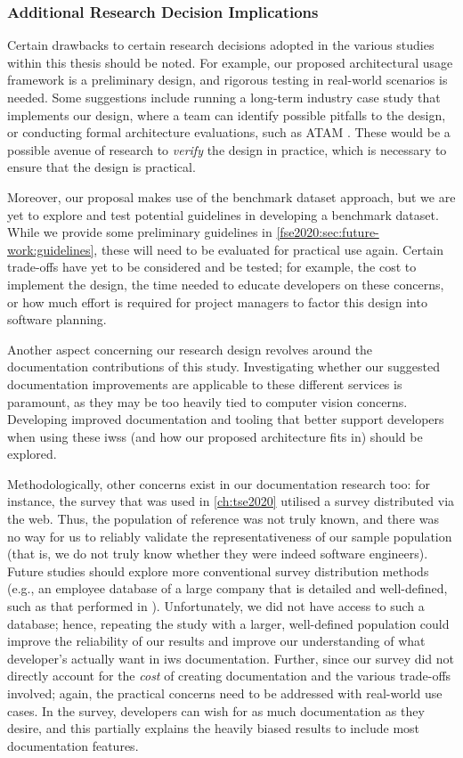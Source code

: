 \subsubsection{Additional Research Decision Implications}

Certain drawbacks to certain research decisions adopted in the various studies within this thesis should be noted. For example, our proposed architectural usage framework is a preliminary design, and rigorous testing in real-world scenarios is needed. Some suggestions include running a long-term industry case study that implements our design, where a team can identify possible pitfalls to the design, or conducting formal architecture evaluations, such as ATAM \citep{Kazman2000}. These would be a possible avenue of research to \textit{verify} the design in practice, which is necessary to ensure that the design is practical. 

Moreover, our proposal makes use of the benchmark dataset approach, but we are yet to explore and test potential guidelines in developing a benchmark dataset. While we provide some preliminary guidelines in \cref{fse2020:sec:future-work:guidelines}, these will need to be evaluated for practical use again. Certain trade-offs have yet to be considered and be tested; for example, the cost to implement the design, the time needed to educate developers on these concerns, or how much effort is required for project managers to factor this design into software planning.

Another aspect concerning our research design revolves around the documentation contributions of this study. Investigating whether our suggested documentation improvements are applicable to these different services is paramount, as they may be too heavily tied to computer vision concerns. Developing improved documentation and tooling that better support developers when using these \glspl{iws} (and how our proposed architecture fits in) should be explored. 

Methodologically, other concerns exist in our documentation research too: for instance, the survey that was used in \cref{ch:tse2020} utilised a survey distributed via the web. Thus, the population of reference was not truly known, and there was no way for us to reliably validate the representativeness of our sample population (that is, we do not truly know whether they were indeed software engineers). Future studies should explore more conventional survey distribution methods (e.g., an employee database of a large company that is detailed and well-defined, such as that performed in \citep{Robillard:hk}). Unfortunately, we did not have access to such a database; hence, repeating the study with a larger, well-defined population could improve the reliability of our results and improve our understanding of what developer's actually want in \gls{iws} documentation. Further, since our survey did not directly account for the \textit{cost} of creating documentation and the various trade-offs involved; again, the practical concerns need to be addressed with real-world use cases. In the survey, developers can wish for as much documentation as they desire, and this partially explains the heavily biased results to include most documentation features.

